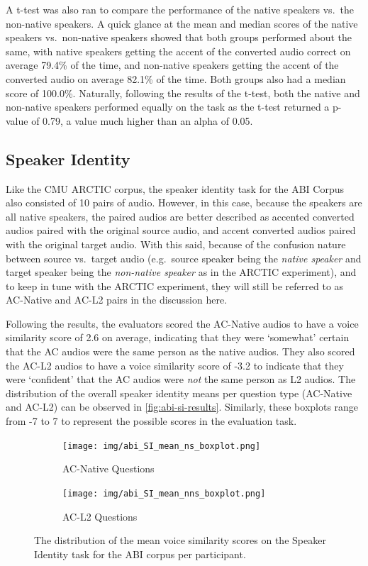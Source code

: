 \documentclass
[
    a4paper,
    twoside,
    12pt,
]
{report}
\begin{document}
A t-test was also ran to compare the performance of the native speakers
vs.~the non-native speakers. A quick glance at the mean and median
scores of the native speakers vs.~non-native speakers showed that both
groups performed about the same, with native speakers getting the accent
of the converted audio correct on average 79.4\% of the time, and
non-native speakers getting the accent of the converted audio on average
82.1\% of the time. Both groups also had a median score of 100.0\%.
Naturally, following the results of the t-test, both the native and
non-native speakers performed equally on the task as the t-test returned
a p-value of 0.79, a value much higher than an alpha of 0.05.

\hypertarget{speaker-identity-1}{%
\subsection{Speaker Identity}\label{speaker-identity-1}}

Like the CMU ARCTIC corpus, the speaker identity task for the ABI Corpus
also consisted of 10 pairs of audio. However, in this case, because the
speakers are all native speakers, the paired audios are better described
as accented converted audios paired with the original source audio, and
accent converted audios paired with the original target audio. With this
said, because of the confusion nature between source vs.~target audio
(e.g.~source speaker being the \emph{native speaker} and target speaker
being the \emph{non-native speaker} as in the ARCTIC experiment), and to
keep in tune with the ARCTIC experiment, they will still be referred to
as AC-Native and AC-L2 pairs in the discussion here.

Following the results, the evaluators scored the AC-Native audios to
have a voice similarity score of 2.6 on average, indicating that they
were `somewhat' certain that the AC audios were the same person as the
native audios. They also scored the AC-L2 audios to have a voice
similarity score of -3.2 to indicate that they were `confident' that the
AC audios were \emph{not} the same person as L2 audios. The distribution
of the overall speaker identity means per question type (AC-Native and
AC-L2) can be observed in \autoref{fig:abi-si-results}. Similarly, these
boxplots range from -7 to 7 to represent the possible scores in the
evaluation task.

\begin{figure}[]
   \centering
   \begin{subfigure}[b]{1\textwidth}
      \texttt{[image: img/abi\_SI\_mean\_ns\_boxplot.png]}
         \caption{AC-Native Questions}
         \label{fig:abi-si-ns-results}
   \end{subfigure}
   \quad
   \begin{subfigure}[b]{1\textwidth}
      \texttt{[image: img/abi\_SI\_mean\_nns\_boxplot.png]}
         \caption{AC-L2 Questions}
         \label{fig:abi-si-nns-results}
   \end{subfigure} 
   \quad
   \caption{The distribution of the mean voice similarity scores on the Speaker Identity task for the ABI corpus per participant.}
   \label{fig:abi-si-results}
\end{figure}
\end{document}
